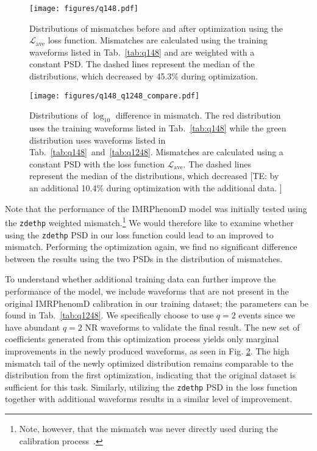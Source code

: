 \documentclass[twocolumn]{aastex631}
\newcommand{\zdethp}{\texttt{zdethp}}
\newcommand{\te}[1]{{\color{rr}[TE: #1 ]}}
\begin{document}
\begin{figure}[t]
	\centering
	\texttt{[image: figures/q148.pdf]}
	\caption{Distributions of mismatches before and after optimization using the 
	$\mathcal{L}_{\mathrm{ave}}$ loss function. Mismatches are calculated using the training waveforms listed in 
	Tab.~\ref{tab:q148} and	are weighted with a constant PSD. 
	The dashed lines represent the median of the distributions, which decreased by 45.3\% during optimization.}
	\label{fig:q148}
\end{figure}
\begin{figure}[t]
	\centering
	\texttt{[image: figures/q148\_q1248\_compare.pdf]}
	\caption{Distributions of $\log_{10}$ difference in mismatch. The red
	distribution uses the training waveforms listed in
	Tab.~\ref{tab:q148} while the green distribution uses waveforms
	listed in Tab.~\ref{tab:q148}~and~\ref{tab:q1248}. Mismatches are calculated
	using a constant PSD with the loss function $\mathcal{L}_{\mathrm{ave}}$. 
	The dashed lines represent the median of the distributions, which decreased \te{by an additional 10.4\% during optimization with the additional data.}}
	\label{fig:q148_q1248_compare}
\end{figure}

Note that the performance of the IMRPhenomD model was initially tested using the
{\zdethp} weighted mismatch.\footnote{
	Note, however, that the mismatch was never directly used during the calibration process~\citep{khan2016frequency, khan2019phenomenological}.
} We would therefore like to examine whether using the {\zdethp} PSD in our loss function
could lead to an improved to mismatch. Performing the optimization again, we find no significant difference
between the results using the two PSDs in the distribution of mismatches.

To understand whether additional training data can further improve the
performance of the model, we include waveforms that are not present in the
original IMRPhenomD calibration in our training dataset; the parameters
can be found in Tab.~\ref{tab:q1248}. We specifically choose to use $q=2$ events
since we have abundant $q=2$ NR waveforms to validate the final result. The new
set of coefficients generated from this optimization process yields only
marginal improvements in the newly produced waveforms, as seen in Fig.
\ref{fig:q148_q1248_compare}. The high mismatch tail of the newly optimized
distribution remains comparable to the distribution from the first optimization, indicating that
the original dataset is sufficient for this task. Similarly, utilizing the
{\zdethp} PSD in the loss function together with additional waveforms results in a
similar level of improvement.
\end{document}
